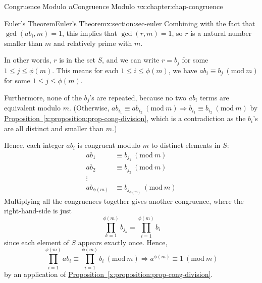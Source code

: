 \documentclass[oneside,10pt,]{book}
\newcommand{\xreffont}{\relax}
\numberwithin{equation}{section}
\newlength{\qrsize}
\newlength{\previewwidth}
\newcommand{\Mod}[1]{\ \left(\mathrm{mod}\ #1\right)}
\newcommand{\amp}{&}
\begin{document}
\begin{chapterptx}{Congruence Modulo \(n\)}{}{Congruence Modulo \(n\)}{}{}{x:chapter:chap-congruence}
\begin{sectionptx}{Euler's Theorem}{}{Euler's Theorem}{}{}{x:section:sec-euler}
Combining with the fact that \(\gcd(ab_i,m) = 1\), this implies that \(\gcd(r,m) = 1\), so \(r\) is a natural number smaller than \(m\) and relatively prime with \(m\).%
\par
In other words, \(r\) is in the set \(S\), and we can write \(r = b_j\) for some \(1 \leq j \leq \phi(m)\). This means for each \(1 \leq i \leq \phi(m)\), we have \(ab_i \equiv b_j \Mod{m}\) for some \(1 \leq j \leq \phi(m)\).%
\par
Furthermore, none of the \(b_j\)'s are repeated, because no two \(ab_i\) terms are equivalent modulo \(m\). (Otherwise, \(ab_{i_1} \equiv ab_{i_2} \Mod{m} \Rightarrow b_{i_1} \equiv b_{i_2} \Mod{m}\) by \hyperref[x:proposition:prop-cong-division]{Proposition~{\xreffont\ref{x:proposition:prop-cong-division}}}, which is a contradiction as the \(b_i\)'s are all distinct and smaller than \(m\).)%
\par
Hence, each integer \(ab_i\) is congruent modulo \(m\) to distinct elements in \(S\):%
\begin{align*}
ab_1 \amp \equiv b_{j_1} \Mod{m}\\
ab_2 \amp \equiv b_{j_2} \Mod{m}\\
\vdots \amp\\
ab_{\phi(m)} \amp \equiv b_{j_{\phi(m)}} \Mod{m}
\end{align*}
Multiplying all the congruences together gives another congruence, where the right-hand-side is just%
\begin{equation*}
\displaystyle\prod_{k=1}^{\phi(m)} b_{j_k} = \displaystyle\prod_{i=1}^{\phi(m)} b_i
\end{equation*}
since each element of \(S\) appears exactly once. Hence,%
\begin{equation*}
\prod_{i=1}^{\phi(m)} ab_i \equiv \prod_{i=1}^{\phi(m)} b_i \Mod{m} \Rightarrow a^{\phi(m)} \equiv 1 \Mod{m}
\end{equation*}
by an application of \hyperref[x:proposition:prop-cong-division]{Proposition~{\xreffont\ref{x:proposition:prop-cong-division}}}.%
\begin{sidebyside}{1}{0}{0}{0}%
\begin{sbspanel}{1}%
\setlength{\qrsize}{9em}
\setlength{\previewwidth}{\linewidth}
\addtolength{\previewwidth}{-\qrsize}
\begin{tcbraster}[raster columns=2, raster column skip=1pt, raster halign=center, raster force size=false, raster left skip=0pt, raster right skip=0pt]%
\begin{tcolorbox}[previewstyle, width=\previewwidth]%

\end{tcolorbox}
\end{tcbraster}
\end{sbspanel}
\end{sidebyside}
\end{sectionptx}
\end{chapterptx}
\end{document}
